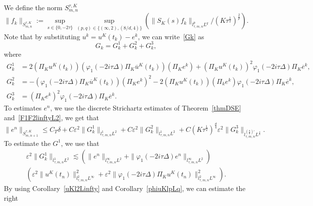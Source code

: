 \documentclass[10pt,a4paper]{article}
\begin{document}
  We define the norm \(S^{\tau,K}_{m,n}\)
  \[ \|f_k\|_{S^{\tau,K}_{m,n}} := \sup_{s \in \{0,-2\tau\}}\sup_{(p,q) \in \{(\infty,2),(8/d,4)\}} 
  (\|S_K(s)f_k\|_{l^p_{\tau,m,n} L^q} / (K\tau^\frac12)^\frac2p). \]
  Note that by substituting \(u^k = u^K(t_k) - e^k \), we can write~\eqref{Gk}
  as 
  \[ G_k = G_k^1 + G_k^2 + G_k^3, \]
  where 
  \begin{equation*}
    \begin{aligned}
      G_k^1 &= 2(\Pi_K u^K(t_k))(\varphi_1(-2i\tau\Delta)\Pi_K\overline u^K(t_k))(\Pi_K e^k)
      + (\Pi_K u^K(t_k))^2\varphi_1(-2i\tau\Delta)\Pi_K\overline e^k, \\
      G_k^2 &= -\left(\varphi_1(-2i\tau\Delta)\Pi_K \overline u^K(t_k)\right)(\Pi_K e^k)^2 
      - 2(\Pi_K u^K(t_k))(\Pi_k e^k)\varphi_1(-2i\tau\Delta)\Pi_K \overline e^k, \\
      G_k^3 &= (\Pi_K e^k)^2\varphi_1(-2i\tau\Delta)\Pi_K\overline e^k.
    \end{aligned}
  \end{equation*}
  To estimates \(e^n\), we use the discrete Strichartz estimates of
  Theorem~\ref{thmDSE} and~\eqref{F1F2linftyL2}, we get that 
  \begin{equation}\label{enlinftyL2}
    \|e^n\|_{S^{\tau,K}_{m,n+1}} \leq C_T \delta + C \varepsilon^2\|G_k^1\|_{l^1_{\tau,m,n}L^2} 
    + C \varepsilon^2\|G_k^2\|_{l^1_{\tau,m,n}L^2} + C (K\tau^\frac12)^\frac d4 
    \varepsilon^2\|G_k^3\|_{l^{(\frac8d)'}_{\tau,m,n}L^\frac43} .
  \end{equation}
  To estimate the \(G^1\), we use that 
  \begin{multline*}
    \varepsilon^2\|G_k^1\|_{l^1_{\tau,m,n}L^2} \lesssim \left(\|e^n\|_{l^\infty_{\tau,m,n}L^2}
    + \|\varphi_1(-2i\tau\Delta)e^n\|_{l^\infty_{\tau,m,n}L^2} \right) \\ \left( 
    \varepsilon^2 \|u^K(t_n)\|_{l^2_{\tau,m,n}L^\infty}^2 + 
    \varepsilon^2 \|\varphi_1(-2i\tau\Delta)\Pi_K u^K(t_n)\|_{l^2_{\tau,m,n}L^\infty}^2 \right).
  \end{multline*}
  By using Corollary~\ref{uKl2Linfty} and Corollary~\ref{phiuKlpLq}, we can estimate the right
\end{document}
